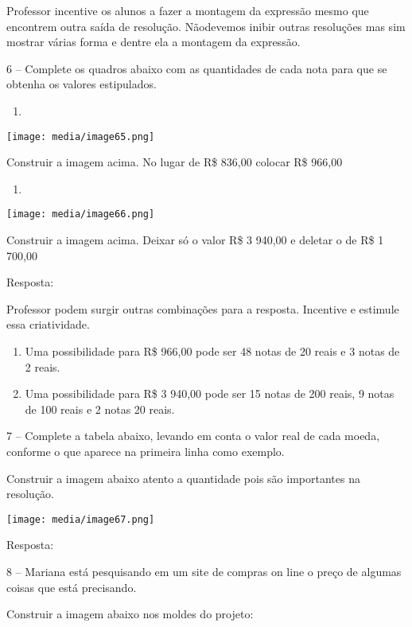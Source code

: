 Professor incentive os alunos a fazer a montagem da expressão mesmo que
encontrem outra saída de resolução. Nãodevemos inibir outras resoluções
mas sim mostrar várias forma e dentre ela a montagem da expressão.

6 -- Complete os quadros abaixo com as quantidades de cada nota para que
se obtenha os valores estipulados.

\begin{enumerate}
\def\labelenumi{\alph{enumi})}
\item
\end{enumerate}

\texttt{[image: media/image65.png]}

Construir a imagem acima. No lugar de R\$ 836,00 colocar R\$ 966,00

\begin{enumerate}
\def\labelenumi{\alph{enumi})}
\item
\end{enumerate}

\texttt{[image: media/image66.png]}

Construir a imagem acima. Deixar só o valor R\$ 3 940,00 e deletar o de
R\$ 1 700,00

Resposta:

Professor podem surgir outras combinações para a resposta. Incentive e
estimule essa criatividade.

\begin{enumerate}
\def\labelenumi{\alph{enumi})}
\item
  Uma possibilidade para R\$ 966,00 pode ser 48 notas de 20 reais e 3
  notas de 2 reais.
\item
  Uma possibilidade para R\$ 3 940,00 pode ser 15 notas de 200 reais, 9
  notas de 100 reais e 2 notas 20 reais.
\end{enumerate}

7 -- Complete a tabela abaixo, levando em conta o valor real de cada
moeda, conforme o que aparece na primeira linha como exemplo.

Construir a imagem abaixo atento a quantidade pois são importantes na
resolução.

\texttt{[image: media/image67.png]}

Resposta:

8 -- Mariana está pesquisando em um site de compras on line o preço de
algumas coisas que está precisando.

Construir a imagem abaixo nos moldes do projeto:

